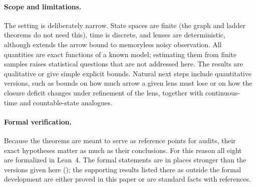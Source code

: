 \paragraph{Scope and limitations.}
The setting is deliberately narrow.
State spaces are finite (the graph and ladder theorems do not need this), time is discrete, and lenses are deterministic, although  extends the arrow bound to memoryless noisy observation.
All quantities are exact functions of a known model; estimating them from finite samples raises statistical questions that are not addressed here.
The results are qualitative or give simple explicit bounds.
Natural next steps include quantitative versions, such as bounds on how much arrow a given lens must lose or on how the closure deficit changes under refinement of the lens, together with continuous-time and countable-state analogues.

\paragraph{Formal verification.}
Because the theorems are meant to serve as reference points for audits, their exact hypotheses matter as much as their conclusions.
For this reason all eight are formalized in Lean~4.
The formal statements are in places stronger than the versions given here (); the supporting results listed there as outside the formal development are either proved in this paper or are standard facts with references.
